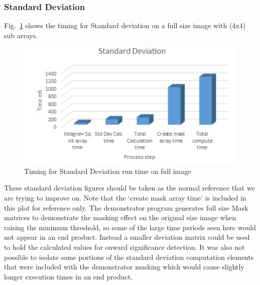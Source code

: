 \documentclass[journal]{IEEEtran}
\begin{document}
\subsubsection*{Standard Deviation}
Fig.~\ref{fig:StdDevTime} shows the timing for Standard deviation on a full size image with (4x4) sub arrays.
 \begin{figure}[hbp]
  \centering
    \includegraphics[width=\columnwidth]{StdDevPlot.jpg}
    \caption{Timing for Standard Deviation run time on full image}
  \label{fig:StdDevTime}
\end{figure}
These standard deviation figures should be taken as the normal reference that we are trying to improve on. Note that the `create mask array time' is included in this plot for reference only. The demonstrator program generates full size Mask matrices to demonstrate the masking effect on the original size image when raising the minimum threshold, so some of the large time periods seen here would not appear in an end product. Instead a smaller deviation matrix could be used to hold the calculated values for onward significance detection. It was also not possible to isolate some portions of the standard deviation computation elements that were included with the demonstrator masking which would cause slightly longer execution times in an end product.\\
 
\end{document}
